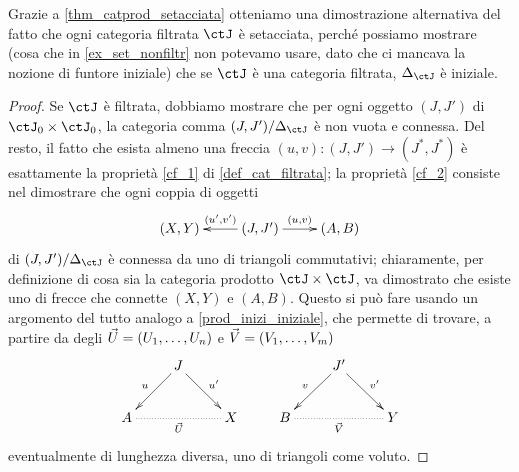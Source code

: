 Grazie a \ref{thm_catprod_setacciata} otteniamo una dimostrazione alternativa del fatto che ogni categoria filtrata \(\ctJ\) è setacciata, perché possiamo mostrare (cosa che in \ref{ex_set_nonfiltr} non potevamo usare, dato che ci mancava la nozione di funtore iniziale) che se \(\ctJ\) è una categoria filtrata, \(\Delta_\ctJ\) è iniziale.
\begin{proof}
 Se \(\ctJ\) è filtrata, dobbiamo mostrare che per ogni oggetto \((J,J')\) di \(\ctJ_0\times\ctJ_0\), la categoria	comma \((J,J')/\Delta_\ctJ\) è non vuota e connessa. Del resto, il fatto che esista almeno una freccia \((u,v) \colon (J,J') \to (J^*,J^*)\) è esattamente la proprietà \ref{cf_1} di \ref{def_cat_filtrata}; la proprietà \ref{cf_2} consiste nel dimostrare che ogni coppia di oggetti
 \[\xymatrix{
  (X,Y) & (J,J') \ar[r]^-{(u,v)}\ar[l]_-{(u',v')}& (A,B)
  }\]
 di \((J,J')/\Delta_\ctJ\) è connessa da uno \zzg di triangoli commutativi; chiaramente, per definizione di cosa sia la categoria prodotto \(\ctJ\times\ctJ\), va dimostrato che esiste uno \zzg di frecce che connette \((X,Y)\) e \((A,B)\). Questo si può fare usando un argomento del tutto analogo a \ref{prod_inizi_iniziale}, che permette di trovare, a partire da degli \zzg \(\vec U = (\tup Un,)\) e \(\vec V = (\tup Vm,)\)
 \[\xymatrix{
   & J \ar@{->}[rd]^{u'} \ar@{->}[ld]_{u} &  &  & J' \ar@{->}[rd]^{v'} \ar@{->}[ld]_{v} &  \\
   A \ar@{.}[rr]_{\vec U} &  & X & B \ar@{.}[rr]_{\vec V} &  & Y
  }\]
 eventualmente di lunghezza diversa, uno \zzg di triangoli come voluto.
\end{proof}
